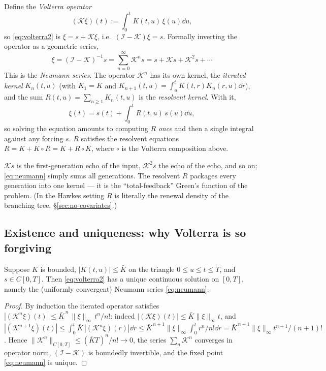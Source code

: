Define the \emph{Volterra operator}
\begin{equation}
(\mathcal K\xi)(t):=\int_0^t K(t,u)\,\xi(u)\dd u,
\end{equation}
so \eqref{eq:volterra2} is $\xi=s+\mathcal K\xi$, i.e.\ $(\mathcal I-\mathcal
K)\xi=s$. Formally inverting the operator as a geometric series,
\begin{equation}
\xi=(\mathcal I-\mathcal K)^{-1}s=\sum_{n=0}^{\infty}\mathcal K^n s
= s+\mathcal K s+\mathcal K^2 s+\cdots
\label{eq:neumann}
\end{equation}
This is the \emph{Neumann series}. The operator $\mathcal K^n$ has its own kernel,
the \emph{iterated kernel} $K_n(t,u)$ (with $K_1=K$ and
$K_{n+1}(t,u)=\int_u^t K(t,r)K_n(r,u)\dd r$), and the sum
$R(t,u)=\sum_{n\ge1}K_n(t,u)$ is the \emph{resolvent kernel}. With it,
\begin{equation}
\xi(t)=s(t)+\int_0^t R(t,u)\,s(u)\dd u,
\label{eq:resolvent}
\end{equation}
so solving the equation amounts to computing $R$ \emph{once} and then a single
integral against any forcing $s$. $R$ satisfies the resolvent equations
$R=K+K\!\circ\!R=K+R\!\circ\!K$, where $\circ$ is the Volterra composition above.

\begin{intuition}
$\mathcal K s$ is the first-generation echo of the input, $\mathcal K^2 s$ the
echo of the echo, and so on; \eqref{eq:neumann} simply sums all generations. The
resolvent $R$ packages every generation into one kernel --- it is the
``total-feedback'' Green's function of the problem. (In the Hawkes setting $R$ is
literally the renewal density of the branching tree, \S\ref{sec:no-covariates}.)
\end{intuition}

\subsection{Existence and uniqueness: why Volterra is so forgiving}

\begin{theorem}\label{thm:vol-exist}
Suppose $K$ is bounded, $|K(t,u)|\le \bar K$ on the triangle $0\le u\le t\le T$,
and $s\in C[0,T]$. Then \eqref{eq:volterra2} has a unique continuous solution on
$[0,T]$, namely the (uniformly convergent) Neumann series \eqref{eq:neumann}.
\end{theorem}
\begin{proof}
By induction the iterated operator satisfies
$|(\mathcal K^n\xi)(t)|\le \bar K^{\,n}\,\|\xi\|_\infty\,t^n/n!$: indeed
$|(\mathcal K\xi)(t)|\le \bar K\|\xi\|_\infty t$, and
$|(\mathcal K^{n+1}\xi)(t)|\le \int_0^t \bar K\,|(\mathcal K^n\xi)(r)|\dd r
\le \bar K^{\,n+1}\|\xi\|_\infty\int_0^t r^n/n!\dd r=\bar K^{\,n+1}\|\xi\|_\infty t^{n+1}/(n+1)!$.
Hence $\|\mathcal K^n\|_{C[0,T]}\le(\bar K T)^n/n!\to 0$, the series
$\sum_n\mathcal K^n$ converges in operator norm, $(\mathcal I-\mathcal K)$ is
boundedly invertible, and the fixed point \eqref{eq:neumann} is unique.
\end{proof}

